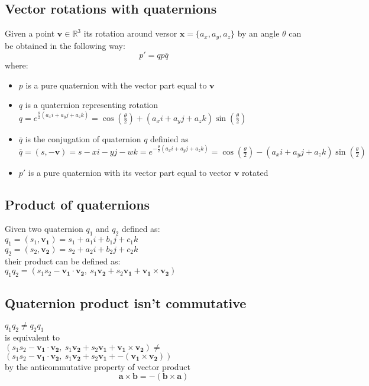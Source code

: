 \subsection{Vector rotations with quaternions}
Given a point $\boldsymbol{v} \in \mathbb{R}^3$ its rotation around versor $\boldsymbol{x}=\{a_x, a_y, a_z\}$ by an angle $\theta$ can be obtained in the following way:
$$ p' = q p \overline{q}$$
where: \\
\begin{itemize}
\item $p$ is a pure quaternion with the vector part equal to $\boldsymbol{v}$
\item $q$ is a quaternion representing rotation $q=e^{\frac{\theta}{2}(a_x i + a_y j + a_z k)}=\cos(\frac{\theta}{2})+(a_x i + a_y j + a_z k)\sin(\frac{\theta}{2})$ 
\item $\overline{q}$ is the conjugation of quaternion $q$ definied as \\
$\overline{q}=(s,-\boldsymbol{v})=s-xi-yj-wk=e^{-\frac{\theta}{2}(a_x i + a_y j + a_z k)}=\cos(\frac{\theta}{2})-(a_x i + a_y j + a_z k)\sin(\frac{\theta}{2})$
\item $p'$ is a pure quaternion with its vector part equal to vector $\boldsymbol{v}$ rotated
\end{itemize}

\subsection{Product of quaternions}
Given two quaternion $q_1$ and $q_2$ defined as: \\
$q_1 = (s_1,\boldsymbol{v_1})=s_1+a_1i+b_1j+c_1k$ \\
$q_2=(s_2,\boldsymbol{v_2})=s_2+a_2i+b_2j+c_2k$ \\
their product can be defined as: \\
$q_1 q_2 = (s_1 s_2 - \boldsymbol{v_1 \cdot v_2}, \ s_1 \boldsymbol{v_2} + s_2 \boldsymbol{v_1} + \boldsymbol{v_1} \times \boldsymbol{v_2})$

\subsection{Quaternion product isn't commutative}
$q_1 q_2 \neq q_2 q_1$  \\
is equivalent to \\
$(s_1 s_2 - \boldsymbol{v_1 \cdot v_2}, \ s_1 \boldsymbol{v_2} + s_2 \boldsymbol{v_1} + \boldsymbol{v_1} \times \boldsymbol{v_2}) \neq $
$(s_1 s_2 - \boldsymbol{v_1 \cdot v_2}, \ s_1 \boldsymbol{v_2} + s_2 \boldsymbol{v_1} + - (\boldsymbol{v_1} \times \boldsymbol{v_2}))$ \\
by the anticommutative property of vector product \cite{amslaurea6701} \\
$$ \boldsymbol{a} \times \boldsymbol{b} = - (\boldsymbol{b} \times \boldsymbol{a}) $$ 

